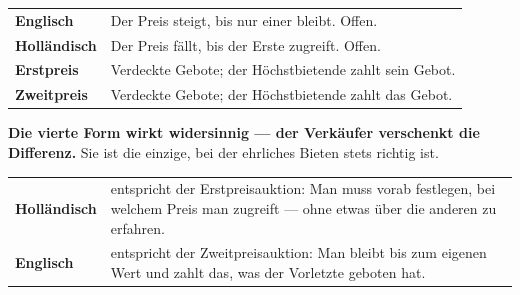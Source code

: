 \begin{merksatz}
\begin{center}
{\small
\renewcommand{\arraystretch}{1.52}
\begin{tabular}{@{}P{2.4cm}P{6.2cm}@{}}
\toprule
\textbf{Englisch} & Der Preis steigt, bis nur einer bleibt. Offen.\\
\textbf{Holländisch} & Der Preis fällt, bis der Erste zugreift. Offen.\\
\textbf{Erstpreis} & Verdeckte Gebote; der Höchstbietende zahlt sein Gebot.\\
\textbf{Zweitpreis} & Verdeckte Gebote; der Höchstbietende zahlt das  Gebot.\\
\bottomrule
\end{tabular}}
\end{center}

\begin{center}
\begin{minipage}{0.9\textwidth}
\textbf{Die vierte Form wirkt widersinnig --- der Verkäufer verschenkt die Differenz.} Sie ist die einzige, bei der ehrliches Bieten stets richtig ist.
\end{minipage}
\end{center}

\begin{center}
{\small
\renewcommand{\arraystretch}{1.5}
\begin{tabular}{@{}P{2.6cm}P{6.0cm}@{}}
\toprule
\textbf{Holländisch} & entspricht der Erstpreisauktion: Man muss vorab festlegen, bei welchem Preis man zugreift --- ohne etwas über die anderen zu erfahren.\\
\textbf{Englisch} & entspricht der Zweitpreisauktion: Man bleibt bis zum eigenen Wert und zahlt das, was der Vorletzte geboten hat.\\
\bottomrule
\end{tabular}}
\end{center}

\begin{center}
\begin{minipage}{0.88\textwidth}
\end{minipage}
\end{center}
\end{merksatz}


